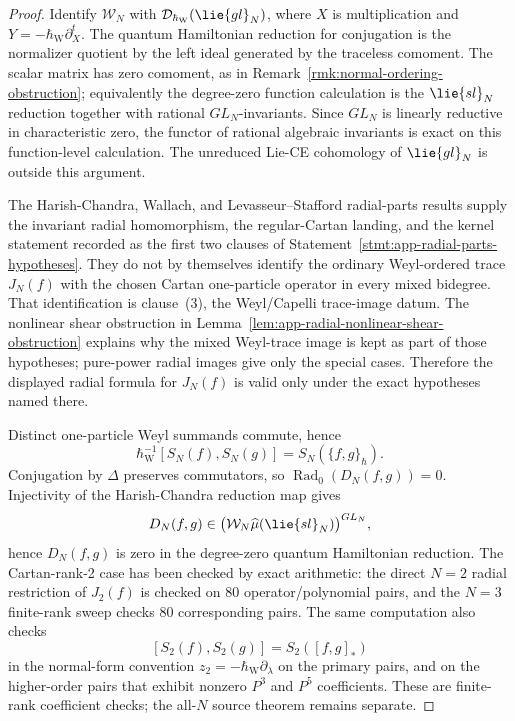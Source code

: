 \documentclass[11pt]{memoir}
\begin{document}
\begin{proof}
  Identify $\mathcal W_N$ with
  $\mathcal D_{\hbar_{\mathrm{W}}}(\lie{gl}_N)$, where $X$ is multiplication and
  $Y=-\hbar_{\mathrm{W}}\partial_X^t$. The quantum Hamiltonian reduction for conjugation is
  the normalizer quotient by the left ideal generated by the traceless
  comoment. The scalar matrix has zero comoment, as in
  Remark~\ref{rmk:normal-ordering-obstruction}; equivalently the degree-zero
  function calculation is the $\lie{sl}_N$ reduction together with rational
  $GL_N$-invariants. Since $GL_N$ is linearly reductive in characteristic
  zero, the functor of rational algebraic invariants is exact on this
  function-level calculation.  The unreduced Lie-CE cohomology of
  \(\lie{gl}_N\) is outside this argument.

  The Harish-Chandra, Wallach, and Levasseur--Stafford radial-parts
  results
  \cite{harish-chandra-invariant-differential-operators}\cite{wallach-reductive-invariant-differential}\cite{levasseur-stafford-harish-chandra}\cite{levasseur-stafford-kernel-harish-chandra}
  supply the invariant radial homomorphism, the regular-Cartan landing,
  and the kernel statement recorded as the first two clauses of
  Statement~\ref{stmt:app-radial-parts-hypotheses}.  They do not by
  themselves identify the ordinary Weyl-ordered trace \(J_N(f)\) with the
  chosen Cartan one-particle operator in every mixed bidegree.  That
  identification is clause~(3), the Weyl/Capelli trace-image datum.  The
  nonlinear shear obstruction in
  Lemma~\ref{lem:app-radial-nonlinear-shear-obstruction} explains why the
  mixed Weyl-trace image is kept as part of those hypotheses; pure-power
  radial images give only the special cases.  Therefore the displayed
  radial formula for \(J_N(f)\) is valid only under the exact hypotheses
  named there.

  Distinct one-particle Weyl summands commute, hence
  $$\hbar_{\mathrm{W}}^{-1}[S_N(f),S_N(g)]=S_N(\{f,g\}_\hbar) .$$ Conjugation by $\Delta$ preserves commutators, so
  $\operatorname{Rad}_0(D_N(f,g))=0$. Injectivity of the Harish-Chandra
  reduction map gives
  $$D_N(f,g)\in
    \bigl(\mathcal W_N\widehat\mu(\lie{sl}_N)\bigr)^{GL_N},$$
  hence $D_N(f,g)$ is zero in the degree-zero quantum Hamiltonian reduction.
  The Cartan-rank-2 case has been checked by exact arithmetic: the direct
  \(N=2\) radial restriction of \(J_2(f)\) is checked on \(80\)
  operator/polynomial pairs, and the \(N=3\) finite-rank sweep checks
  \(80\) corresponding pairs.  The same computation also checks
  $$[S_2(f),S_2(g)]=S_2([f,g]_*)$$
  in the normal-form convention \(z_2=-\hbar_{\mathrm{W}}\partial_\lambda\) on the
  primary pairs, and on the higher-order pairs that exhibit nonzero
  \(P^3\) and \(P^5\) coefficients.  These are finite-rank
  coefficient checks; the all-\(N\) source theorem remains separate.


\end{proof}
\end{document}
